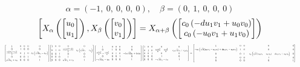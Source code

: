 \documentclass[11pt]{article}
\theoremstyle{definition}
\begin{document}
\[
\alpha = \left( -1, \  0, \  0, \  0, \  0\right), \quad \beta = \left( 0, \  1, \  0, \  0, \  0\right)
\]
\[
\scaletoalign{\textwidth}{\left[ X_{\alpha}\left(\left[\begin{matrix}u_{0}\\u_{1}\end{matrix}\right]\right), X_{\beta}\left(\left[\begin{matrix}v_{0}\\v_{1}\end{matrix}\right]\right) \right] = X_{\alpha + \beta}\left(\left[\begin{matrix}c_{0} \left(- d u_{1} v_{1} + u_{0} v_{0}\right)\\c_{0} \left(- u_{0} v_{1} + u_{1} v_{0}\right)\end{matrix}\right]\right)}
\]
\[
\scaletoalign{\textwidth}{{\left[\begin{matrix}1 & 0 & 0 & 0 & 0\\0 & 1 & 0 & 0 & 0\\\frac{c_{0} \left(d u_{1}^{2} - u_{0}^{2}\right)}{2} & 0 & 1 & 0 & c_{0} \left(\sqrt{d} u_{1} - u_{0}\right)\\0 & 0 & 0 & 1 & 0\\\sqrt{d} u_{1} + u_{0} & 0 & 0 & 0 & 1\end{matrix}\right]} {\left[\begin{matrix}1 & 0 & 0 & 0 & 0\\0 & 1 & 0 & \frac{c_{0} \left(d v_{1}^{2} - v_{0}^{2}\right)}{2} & c_{0} \left(\sqrt{d} v_{1} - v_{0}\right)\\0 & 0 & 1 & 0 & 0\\0 & 0 & 0 & 1 & 0\\0 & 0 & 0 & \sqrt{d} v_{1} + v_{0} & 1\end{matrix}\right]} {\left[\begin{matrix}1 & 0 & 0 & 0 & 0\\0 & 1 & 0 & 0 & 0\\\frac{c_{0} d u_{1}^{2}}{2} - \frac{c_{0} u_{0}^{2}}{2} & 0 & 1 & 0 & - c_{0} \sqrt{d} u_{1} + c_{0} u_{0}\\0 & 0 & 0 & 1 & 0\\- \sqrt{d} u_{1} - u_{0} & 0 & 0 & 0 & 1\end{matrix}\right]} {\left[\begin{matrix}1 & 0 & 0 & 0 & 0\\0 & 1 & 0 & \frac{c_{0} d v_{1}^{2}}{2} - \frac{c_{0} v_{0}^{2}}{2} & - c_{0} \sqrt{d} v_{1} + c_{0} v_{0}\\0 & 0 & 1 & 0 & 0\\0 & 0 & 0 & 1 & 0\\0 & 0 & 0 & - \sqrt{d} v_{1} - v_{0} & 1\end{matrix}\right]} = {\left[\begin{matrix}1 & 0 & 0 & 0 & 0\\- c_{0} \left(\sqrt{d} \left(u_{0} v_{1} - u_{1} v_{0}\right) + d u_{1} v_{1} - u_{0} v_{0}\right) & 1 & 0 & 0 & 0\\0 & 0 & 1 & - c_{0} \left(\sqrt{d} \left(u_{0} v_{1} - u_{1} v_{0}\right) - d u_{1} v_{1} + u_{0} v_{0}\right) & 0\\0 & 0 & 0 & 1 & 0\\0 & 0 & 0 & 0 & 1\end{matrix}\right]}}
\]
\end{document}
